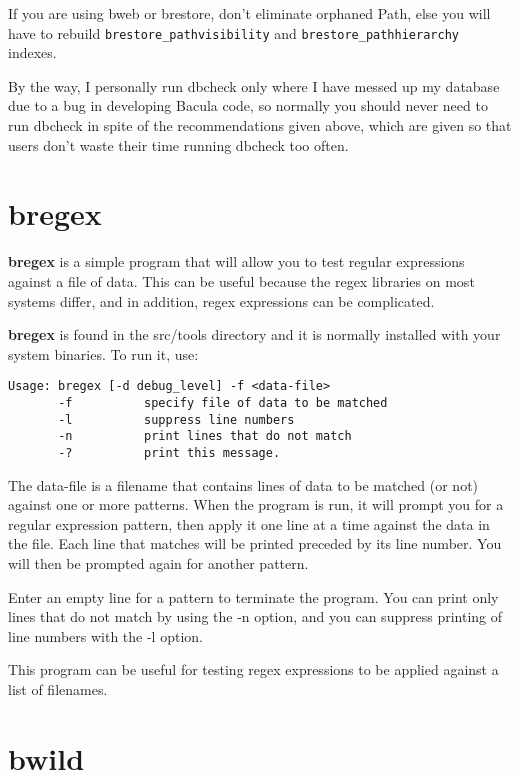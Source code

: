 If you are using bweb or brestore, don't eliminate orphaned Path, else you will
have to rebuild \texttt{brestore\_pathvisibility} and
\texttt{brestore\_pathhierarchy} indexes.

By the way, I personally run dbcheck only where I have messed up
my database due to a bug in developing Bacula code, so normally
you should never need to run dbcheck in spite of the
recommendations given above, which are given so that users don't
waste their time running dbcheck too often.

\section{bregex}
\label{bregex}

{\bf bregex} is a simple program that will allow you to test 
regular expressions against a file of data. This can be useful
because the regex libraries on most systems differ, and in
addition, regex expressions can be complicated.

{\bf bregex} is found in the src/tools directory and it is 
normally installed with your system binaries. To run it, use:

\begin{verbatim}
Usage: bregex [-d debug_level] -f <data-file>
       -f          specify file of data to be matched
       -l          suppress line numbers
       -n          print lines that do not match
       -?          print this message.
\end{verbatim}

The \lt{}data-file\gt{} is a filename that contains lines
of data to be matched (or not) against one or more patterns.
When the program is run, it will prompt you for a regular 
expression pattern, then apply it one line at a time against
the data in the file. Each line that matches will be printed 
preceded by its line number.  You will then be prompted again  
for another pattern.  

Enter an empty line for a pattern to terminate the program. You
can print only lines that do not match by using the -n option,
and you can suppress printing of line numbers with the -l option.

This program can be useful for testing regex expressions to be 
applied against a list of filenames.

\section{bwild}
\label{bwild}


